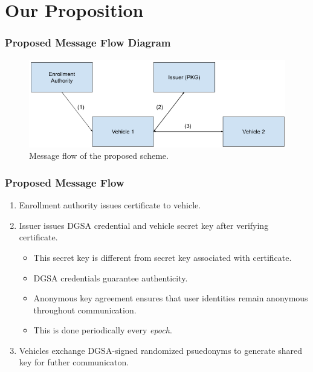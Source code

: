 \documentclass{beamer}
\begin{document}
    \section{Our Proposition}
    \begin{frame}
        \frametitle{Proposed Message Flow Diagram}
        \begin{figure}[!ht]
            \centering
            \includegraphics[width=\columnwidth]{figs/flow.png}
            \caption{Message flow of the proposed scheme.}
            \label{fig:new-flow}
        \end{figure}
    \end{frame}

    \begin{frame}
        \frametitle{Proposed Message Flow}
        \begin{enumerate}
            \item<1-> Enrollment authority issues certificate to vehicle.
            \item<2-> Issuer issues DGSA credential and vehicle secret key after
            verifying certificate.
            \begin{itemize}
                \item This secret key is different from secret key associated
                with certificate.
                \item DGSA credentials guarantee authenticity.
                \item Anonymous key agreement ensures that user identities
                remain anonymous throughout communication.
                \item This is done periodically every \emph{epoch}.
            \end{itemize}
            \item<3-> Vehicles exchange DGSA-signed randomized psuedonyms to
            generate shared key for futher communicaton.
        \end{enumerate}
    \end{frame}
\end{document}
